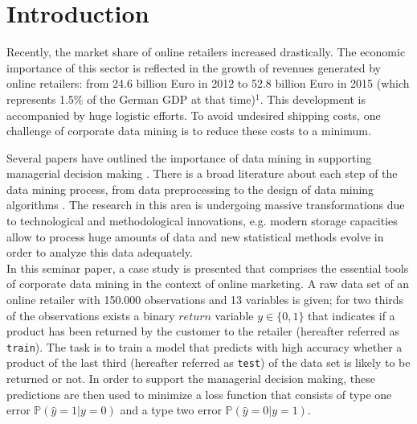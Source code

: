 \documentclass[a4paper,12pt]{article}
\begin{document}
\thispagestyle{empty}


\newpage
\tableofcontents

\newpage

\section{Introduction}

Recently, the market share of online retailers increased drastically. The economic importance of this sector is reflected in the growth of revenues generated by online retailers: from 24.6 billion Euro in 2012 to 52.8 billion Euro in 2015 (which represents 1.5\% of the German GDP at that time)$^1$. This development is accompanied by huge logistic efforts. To avoid undesired shipping costs, one challenge of corporate data mining is to reduce these costs to a minimum.

Several papers have outlined the importance of data mining in supporting managerial decision making \cite{manyika2011}. There is a broad literature about each step of the data mining process, from data preprocessing \cite{crone2006} to the design of data mining algorithms \cite{lessmann2015}. The research in this area is undergoing massive transformations due to technological and methodological innovations, e.g. modern storage capacities allow to process huge amounts of data and new statistical methods evolve in order to analyze this data adequately. \\
In this seminar paper, a case study is presented that comprises the essential tools of corporate data mining in the context of online marketing. A raw data set of an online retailer with 150.000 observations and 13 variables is given; for two thirds of the observations exists a binary $return$ variable $y \in \{0,1\}$ that indicates if a product has been returned by the customer to the retailer (hereafter referred as \texttt{train}). The task is to train a model that predicts with high accuracy whether a product of the last third (hereafter referred as \texttt{test}) of the data set is likely to be returned or not. In order to support the managerial decision making, these predictions are then used to minimize a loss function that consists of type one error $\mathbb{P}(\hat{y}=1|y=0)$ and a type two error $\mathbb{P}(\hat{y}=0|y=1)$.  \\
\end{document}
